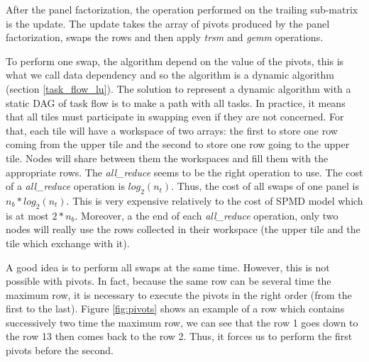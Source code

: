 After the panel factorization, the operation performed on the trailing sub-matrix is the update. The update takes the array of pivots produced by the panel factorization, swaps the rows and then apply \emph{trsm} and \emph{gemm} operations.

To perform one swap, the algorithm depend on the value of the pivots, this is what we call data dependency and so the algorithm is a dynamic algorithm (section \ref{task_flow_lu}). The solution to represent a dynamic algorithm with a static DAG of task flow is to make a path with all tasks. In practice, it means that all tiles must participate in swapping even if they are not concerned.
For that, each tile will have a workspace of two arrays: the first to store one row coming from the upper tile and the second to store one row going to the upper tile. Nodes will share between them the workspaces and fill them with the appropriate rows.
The \emph{all\_reduce} seems to be the right operation to use. The cost of a \emph{all\_reduce} operation is $log_2(n_t)$. Thus, the cost of all swaps of one panel is $n_b*log_2(n_t)$. This is very expensive relatively to the cost of SPMD model which is at most $2*n_b$.
Moreover, a the end of each \emph{all\_reduce} operation, only two nodes will really use the rows collected in their workspace (the upper tile and the tile which exchange with it).

A good idea is to perform all swaps at the same time. However, this is not possible with pivots. In fact, because the same row can be several time the maximum row, it is necessary to execute the pivots in the right order (from the first to the last). Figure \ref{fig:pivots} shows an example of a row which contains successively two time the maximum row, we can see that the row 1 goes down to the row 13 then comes back to the row 2. Thus, it forces us to perform the first pivots before the second.

